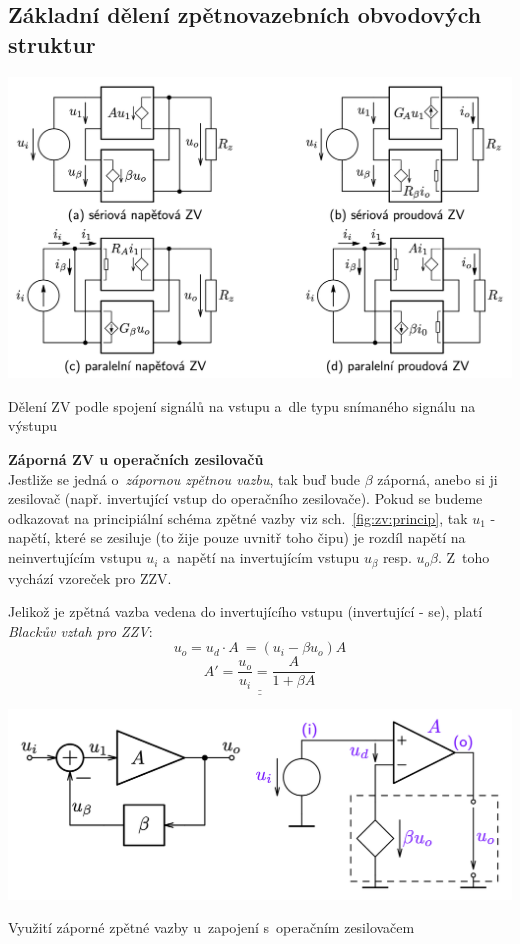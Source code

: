 \documentclass[a4paper,12pt]{article}   %
\begin{document}
\subsection*{Základní dělení zpětnovazebních obvodových struktur}

\begin{schema}[h!]
    \centering
    \includegraphics[width=.8\textwidth]{ZV-obvody.png}
    \caption{Dělení ZV podle spojení signálů na vstupu a~dle typu snímaného signálu na výstupu}
    \label{fig:ZV:deleni}
\end{schema}

\textbf{Záporná ZV u operačních zesilovačů}\\
Jestliže se jedná o~\textit{zápornou zpětnou vazbu}, tak buď bude $\beta$ záporná, anebo si ji  zesilovač (např. invertující vstup do operačního zesilovače). Pokud se budeme odkazovat na principiální schéma zpětné vazby viz sch.~\ref{fig:zv:princip}, tak $u_1$ - napětí, které se zesiluje (to žije pouze uvnitř toho čipu) je rozdíl napětí na neinvertujícím vstupu $u_i$ a~napětí na invertujícím vstupu $u_\beta$ resp. $u_o\beta$. Z~toho vychází vzoreček pro ZZV.

Jelikož je zpětná vazba vedena do invertujícího vstupu (invertující -  se), platí \textit{Blackův vztah pro ZZV}:
\begin{equation*}
    u_o = u_d\cdot A~= (u_i -\beta u_o) A
\end{equation*}
\begin{equation}
    \underline{\underline{A' = \frac{u_o}{u_i} = \frac{A}{1+\beta A}}}
    \label{eq:vysledne:zesileni}
\end{equation}

\begin{schema}[h!]
    \centering
    \includegraphics[width=.7\textwidth]{ZZV-OZ.png}
    \caption{Využití záporné zpětné vazby u~zapojení s~operačním zesilovačem}
    \label{fig:opamp:ZZV}
\end{schema}
\end{document}
